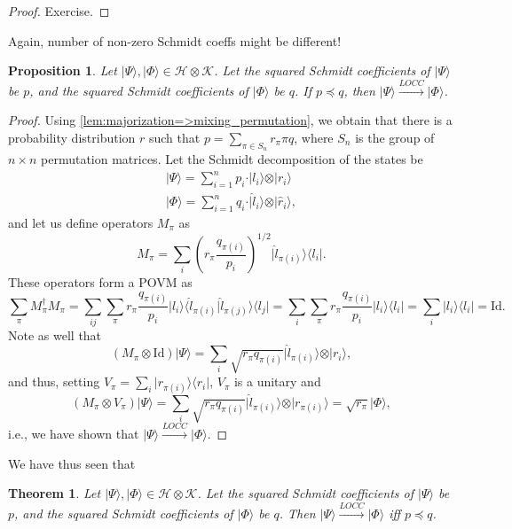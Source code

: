 \documentclass{article}
\newtheorem{proposition}{Proposition}
\newtheorem{theorem}{Theorem}
\theoremstyle{definition}
\newcommand{\id}{\mathrm{Id}}
\newcommand{\ket}[1]{\vert #1 \rangle}
\newcommand{\bra}[1]{\langle #1 \vert}
\newcommand{\scalprod}[2]{\langle #1 \vert #2 \rangle}
\begin{document}
\begin{proof}
  Exercise.
\end{proof}

{\color{red} Again, number of non-zero Schmidt coeffs might be different!}
\begin{proposition}
  Let $\ket{\Psi},\ket{\Phi}\in \mathcal{H}\otimes \mathcal{K}$. Let the squared Schmidt coefficients of $\ket{\Psi}$ be $p$, and the squared Schmidt coefficients of $\ket{\Phi}$ be $q$. If $p\preccurlyeq q$, then $\ket{\Psi}\xrightarrow{LOCC}\ket{\Phi}$. 
\end{proposition}

\begin{proof}
  Using \cref{lem:majorization=>mixing_permutation}, we obtain that there is a probability distribution $r$ such that $p  = \sum_{\pi \in S_n} r_{\pi} \pi q$, where $S_n$ is the group of $n\times n$ permutation matrices. Let the Schmidt decomposition of the states be 
  \begin{align*}
    \ket{\Psi} = \sum_{i=1}^n p_i \cdot \ket{l_i} \otimes \ket{r_i}\\
    \ket{\Phi} = \sum_{i=1}^n q_i \cdot \ket{\hat{l}_i} \otimes \ket{\hat{r}_i},    
  \end{align*}
  and let us define operators $M_{\pi}$ as 
  \begin{equation*}
    M_{\pi} = \sum_i \left( r_\pi \frac{q_{\pi(i)}}{p_i}\right)^{1/2} \ket{\hat{l}_{\pi(i)}} \bra{l_i}. 
  \end{equation*}
  These operators form a POVM as
  \begin{equation*}
    \sum_{\pi} M_\pi^\dagger M_\pi = \sum_{ij}\sum_\pi  r_\pi \frac{q_{\pi(i)}}{p_i} \ket{l_i}\scalprod{\hat{l}_{\pi(i)}}{\hat{l}_{\pi(j)}}\bra{l_j} = \sum_{i}\sum_\pi  r_\pi \frac{q_{\pi(i)}}{p_i} \ket{l_i}\bra{l_i}  = \sum_{i} \ket{l_i}\bra{l_i}  = \id.
  \end{equation*}
  Note as well that 
  \begin{equation*}
    (M_\pi \otimes \id) \ket{\Psi} = \sum_i  \sqrt{r_\pi q_{\pi(i)}} \ket{\hat{l}_{\pi(i)}}\otimes \ket{r_i}, 
  \end{equation*}
  and thus, setting $V_{\pi} = \sum_i \ket{r_{\pi(i)}}\bra{r_i}$, $V_\pi$ is a unitary and 
  \begin{equation*}
    (M_\pi \otimes V_\pi) \ket{\Psi} = \sum_i  \sqrt{r_\pi q_{\pi(i)}} \ket{\hat{l}_{\pi(i)}}\otimes \ket{r_{\pi(i)}} = \sqrt{r_\pi} \ket{\Phi}, 
  \end{equation*}
  i.e., we have shown that $\ket{\Psi}\xrightarrow{LOCC}\ket{\Phi}$.
\end{proof}

We have thus seen that
\begin{theorem}
  Let $\ket{\Psi},\ket{\Phi}\in \mathcal{H}\otimes \mathcal{K}$. Let the squared Schmidt coefficients of $\ket{\Psi}$ be $p$, and the squared Schmidt coefficients of $\ket{\Phi}$ be $q$. Then $\ket{\Psi}\xrightarrow{LOCC}\ket{\Phi}$ iff  $p\preccurlyeq q$.   
\end{theorem}
\end{document}
